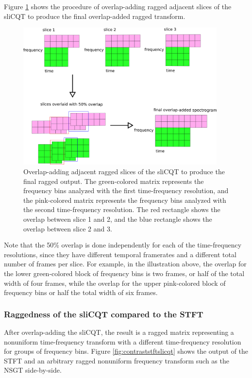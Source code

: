 \documentclass[report.tex]{subfiles}
\begin{document}
Figure \ref{fig:raggedslicqtoverlapadd} shows the procedure of overlap-adding ragged adjacent slices of the sliCQT to produce the final overlap-added ragged transform.

\begin{figure}[ht]
	\centering
	\includegraphics[width=0.9375\textwidth]{./images-blockdiagrams/overlapprocess.png}
	\caption{Overlap-adding adjacent ragged slices of the sliCQT to produce the final ragged output. The green-colored matrix represents the frequency bins analyzed with the first time-frequency resolution, and the pink-colored matrix represents the frequency bins analyzed with the second time-frequency resolution. The red rectangle shows the overlap between slice 1 and 2, and the blue rectangle shows the overlap between slice 2 and 3.}
	\label{fig:raggedslicqtoverlapadd}
\end{figure}

Note that the 50\% overlap is done independently for each of the time-frequency resolutions, since they have different temporal framerates and a different total number of frames per slice. For example, in the illustration above, the overlap for the lower green-colored block of frequency bins is two frames, or half of the total width of four frames, while the overlap for the upper pink-colored block of frequency bins or half the total width of six frames.

\subsubsection{Raggedness of the sliCQT compared to the STFT}
\label{sec:stftslicqtcomp2}

After overlap-adding the sliCQT, the result is a ragged matrix representing a nonuniform time-frequency transform with a different time-frequency resolution for groups of frequency bins. Figure \ref{fig:contraststftslicqt} shows the output of the STFT and an arbitrary ragged nonuniform frequency transform such as the NSGT side-by-side.
\end{document}
